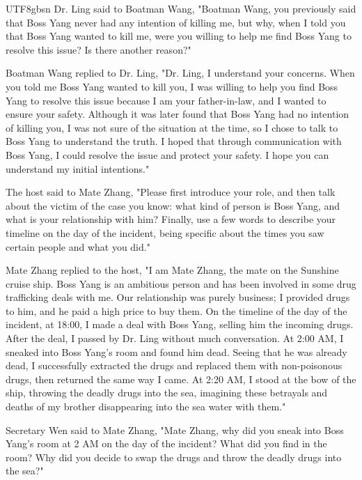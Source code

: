 \documentclass[11pt]{article}
\begin{document}
{\begin{CJK}{UTF8}{gbsn}
Dr. Ling said to Boatman Wang, "Boatman Wang, you previously said that Boss Yang never had any intention of killing me, but why, when I told you that Boss Yang wanted to kill me, were you willing to help me find Boss Yang to resolve this issue? Is there another reason?"

Boatman Wang replied to Dr. Ling, "Dr. Ling, I understand your concerns. When you told me Boss Yang wanted to kill you, I was willing to help you find Boss Yang to resolve this issue because I am your father-in-law, and I wanted to ensure your safety. Although it was later found that Boss Yang had no intention of killing you, I was not sure of the situation at the time, so I chose to talk to Boss Yang to understand the truth. I hoped that through communication with Boss Yang, I could resolve the issue and protect your safety. I hope you can understand my initial intentions."

The host said to Mate Zhang, "Please first introduce your role, and then talk about the victim of the case you know: what kind of person is Boss Yang, and what is your relationship with him? Finally, use a few words to describe your timeline on the day of the incident, being specific about the times you saw certain people and what you did."

Mate Zhang replied to the host, "I am Mate Zhang, the mate on the Sunshine cruise ship. Boss Yang is an ambitious person and has been involved in some drug trafficking deals with me. Our relationship was purely business; I provided drugs to him, and he paid a high price to buy them. On the timeline of the day of the incident, at 18:00, I made a deal with Boss Yang, selling him the incoming drugs. After the deal, I passed by Dr. Ling without much conversation. At 2:00 AM, I sneaked into Boss Yang's room and found him dead. Seeing that he was already dead, I successfully extracted the drugs and replaced them with non-poisonous drugs, then returned the same way I came. At 2:20 AM, I stood at the bow of the ship, throwing the deadly drugs into the sea, imagining these betrayals and deaths of my brother disappearing into the sea water with them."

Secretary Wen said to Mate Zhang, "Mate Zhang, why did you sneak into Boss Yang's room at 2 AM on the day of the incident? What did you find in the room? Why did you decide to swap the drugs and throw the deadly drugs into the sea?"


\end{CJK}}
\end{document}

